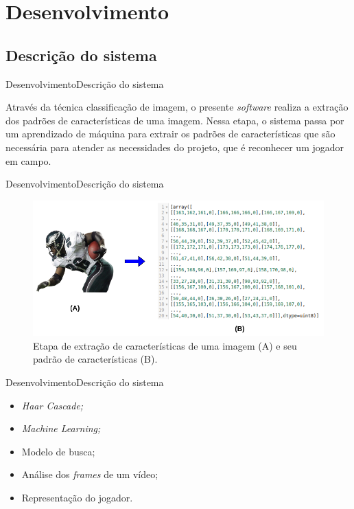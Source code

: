 \section{Desenvolvimento}
\subsection{Descrição do sistema}
\begin{frame}{Desenvolvimento}{Descrição do sistema}

Através da técnica classificação de imagem, o presente \textit{software} realiza a extração dos padrões de características de uma imagem. Nessa etapa, o sistema passa por um aprendizado de máquina para extrair os padrões de características que são necessária para atender as necessidades do projeto, que é reconhecer um jogador em campo.

\end{frame}

\begin{frame}{Desenvolvimento}{Descrição do sistema}
\begin{figure}
    \centering
    \caption{\label{fig_conversao_img}Etapa de extração de características de uma imagem (A) e seu padrão de características (B).}
    \includegraphics[scale=0.4]{05-SLIDES_DESENVOLVIMENTO/Imagens/conversao-de-imagem.png}
\end{figure}
\end{frame}

\begin{frame}{Desenvolvimento}{Descrição do sistema}
\begin{itemize}
    \item<1> \textit{Haar Cascade;}
    \item<1> \textit{Machine Learning;}
    \item<1> Modelo de busca;
    \item<1> Análise dos \textit{frames} de um vídeo;
    \item<1> Representação do jogador.
\end{itemize}
\end{frame}

